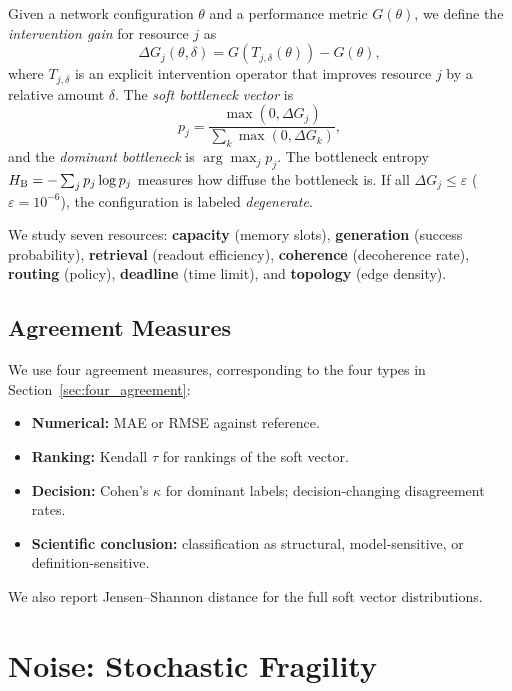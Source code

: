 \documentclass[aps,prapplied,reprint,superscriptaddress]{revtex4-2}
\newcommand{\DG}{\Delta G}
\newcommand{\HB}{H_{\rm B}}
\begin{document}
Given a network configuration $\theta$ and a performance metric $G(\theta)$, we define the \emph{intervention gain} for resource $j$ as
\begin{equation}
\DG_j(\theta, \delta) = G(T_{j,\delta}(\theta)) - G(\theta),
\end{equation}
where $T_{j,\delta}$ is an explicit intervention operator that improves resource $j$ by a relative amount $\delta$. The \emph{soft bottleneck vector} is
\begin{equation}
p_j = \frac{\max(0, \DG_j)}{\sum_k \max(0, \DG_k)},
\end{equation}
and the \emph{dominant bottleneck} is $\arg\max_j p_j$. The bottleneck entropy $\HB = -\sum_j p_j \log p_j$ measures how diffuse the bottleneck is. If all $\DG_j \leq \varepsilon$ ($\varepsilon = 10^{-6}$), the configuration is labeled \emph{degenerate}.

We study seven resources: \textbf{capacity} (memory slots), \textbf{generation} (success probability), \textbf{retrieval} (readout efficiency), \textbf{coherence} (decoherence rate), \textbf{routing} (policy), \textbf{deadline} (time limit), and \textbf{topology} (edge density).

\subsection{Agreement Measures}

We use four agreement measures, corresponding to the four types in Section~\ref{sec:four_agreement}:
\begin{itemize}[leftmargin=2em]
\item \textbf{Numerical:} MAE or RMSE against reference.
\item \textbf{Ranking:} Kendall $\tau$ for rankings of the soft vector.
\item \textbf{Decision:} Cohen's $\kappa$ for dominant labels; decision-changing disagreement rates.
\item \textbf{Scientific conclusion:} classification as structural, model-sensitive, or definition-sensitive.
\end{itemize}
We also report Jensen--Shannon distance for the full soft vector distributions.

\section{Noise: Stochastic Fragility}
\label{sec:noise}
\end{document}
